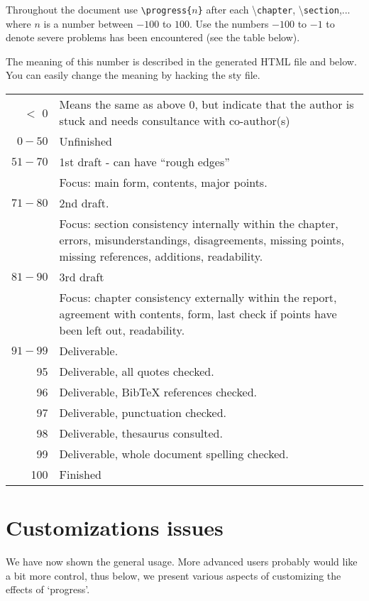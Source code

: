 \documentclass{article}
\begin{document}
Throughout  the document use \verb|\progress{|$n$\verb|}| after each \textbackslash\texttt{chapter}, \textbackslash\texttt{section},... where $n$ is a number between $-100$ to $100$. Use the numbers $-100$ to $-1$ to denote severe problems has been encountered (see the table below).

The meaning of this number is described in the generated HTML file and below. You can easily change the meaning by hacking the sty file.

\medskip

\begin{tabular}{rp{10cm}}
\hline
$<$ 0  & Means the same as above 0, but indicate that the author is stuck and needs consultance with co-author(s)\\
$0-50$ & Unfinished\\
$51-70$& 1st draft - can have ``rough edges''\\
       & Focus: main form, contents, major points.\\
$71-80$& 2nd draft.\\
       & Focus: section consistency internally within the chapter, errors, misunderstandings, disagreements, missing points, missing references, additions, readability.\\
$81-90$& 3rd draft\\
       & Focus: chapter consistency externally within the report, agreement with contents, form, last check if points have been left out, readability.\\
$91-99$& Deliverable.\\
95 	    & Deliverable, all quotes checked.\\
96 	    & Deliverable, BibTeX references checked.\\
97 	    & Deliverable, punctuation checked.\\
98 	    & Deliverable, thesaurus consulted.\\
99 	    & Deliverable, whole document spelling checked.\\
100     & Finished\\
\hline
\end{tabular}


\section{Customizations issues}
We have now shown the general usage. More advanced users probably would like a bit more control, thus below, we present various aspects of customizing the effects of `progress'.
\end{document}
